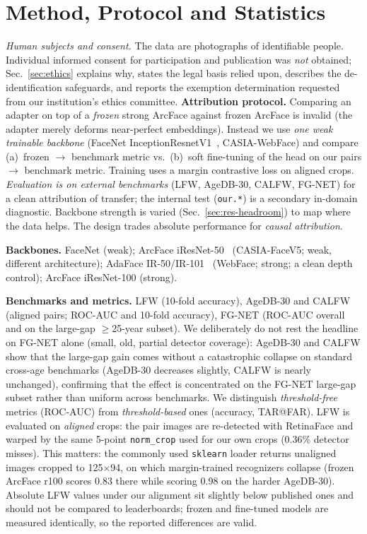 \documentclass[journal]{IEEEtran}
\begin{document}
\section{Method, Protocol and Statistics}\label{sec:method}
\emph{Human subjects and consent.} The data are photographs of identifiable people. Individual informed consent for participation and publication was \emph{not} obtained; Sec.~\ref{sec:ethics} explains why, states the legal basis relied upon, describes the de-identification safeguards, and reports the exemption determination requested from our institution's ethics committee.
\textbf{Attribution protocol.} Comparing an adapter on top of a \emph{frozen} strong ArcFace against frozen ArcFace is invalid (the adapter merely deforms near-perfect embeddings). Instead we use \emph{one weak trainable backbone} (FaceNet InceptionResnetV1~\cite{schroff2015facenet}, CASIA-WebFace) and compare (a)~frozen $\rightarrow$ benchmark metric vs.\ (b)~soft fine-tuning of the head on our pairs $\rightarrow$ benchmark metric. Training uses a margin contrastive loss on aligned crops. \emph{Evaluation is on external benchmarks} (LFW, AgeDB-30, CALFW, FG-NET) for a clean attribution of transfer; the internal test (\texttt{our.*}) is a secondary in-domain diagnostic. Backbone strength is varied (Sec.~\ref{sec:res-headroom}) to map where the data helps. The design trades absolute performance for \emph{causal attribution}.

\textbf{Backbones.} FaceNet (weak); ArcFace iResNet-50~\cite{deng2019arcface} (CASIA-FaceV5; weak, different architecture); AdaFace IR-50/IR-101~\cite{kim2022adaface} (WebFace; strong; a clean depth control); ArcFace iResNet-100 (strong).

\textbf{Benchmarks and metrics.} LFW (10-fold accuracy), AgeDB-30 and CALFW (aligned pairs; ROC-AUC and 10-fold accuracy), FG-NET (ROC-AUC overall and on the large-gap $\geq$25-year subset). We deliberately do not rest the headline on FG-NET alone (small, old, partial detector coverage): AgeDB-30 and CALFW show that the large-gap gain comes without a catastrophic collapse on standard cross-age benchmarks (AgeDB-30 decreases slightly, CALFW is nearly unchanged), confirming that the effect is concentrated on the FG-NET large-gap subset rather than uniform across benchmarks. We distinguish \emph{threshold-free} metrics (ROC-AUC) from \emph{threshold-based} ones (accuracy, TAR@FAR). LFW is evaluated on \emph{aligned} crops: the pair images are re-detected with RetinaFace and warped by the same 5-point \texttt{norm\_crop} used for our own crops (0.36\% detector misses). This matters: the commonly used \texttt{sklearn} loader returns unaligned images cropped to 125$\times$94, on which margin-trained recognizers collapse (frozen ArcFace r100 scores 0.83 there while scoring 0.98 on the harder AgeDB-30). Absolute LFW values under our alignment sit slightly below published ones and should not be compared to leaderboards; frozen and fine-tuned models are measured identically, so the reported differences are valid.
\end{document}
